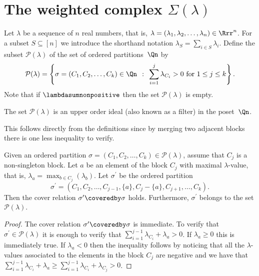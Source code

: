 \section{The weighted complex \texorpdfstring{$\Sigma(\lambda)$}{Sigma(lambda)}}
\label{section_the_weighted_complex}

Let $\lambda$ be a sequence of $n$ real numbers,
that is, $\lambda = (\lambda_{1}, \lambda_{2}, \ldots, \lambda_{n}) \in \Rrr^{n}$.
For a subset $S \subseteq [n]$ we introduce the shorthand notation
$\lambda_{S} = \sum_{i \in S} \lambda_{i}$.
Define the subset $\mathcal{P}(\lambda)$ of the set of ordered 
partitions~$\Qn$ by
$$
\mathcal{P}(\lambda)
=
\left\{ \sigma = (C_{1}, C_{2}, \ldots, C_{k}) \in \Qn \:\: : \:\:
\sum_{i=1}^{j} \lambda_{C_{i}} > 0 \text{ for } 1 \leq j \leq k \right\} .
$$
Note that if $\lambdasumnonpositive$
then the set $\mathcal{P}(\lambda)$ is empty.


\begin{lemma}
The set $\mathcal{P}(\lambda)$ is an upper order ideal (also
known as a filter)
in the poset~$\Qn$.
\end{lemma}
This follows directly from the definitions
since by merging two adjacent blocks
there is one less inequality to verify.

\begin{lemma}
Given an ordered partition
$\sigma = (C_{1}, C_{2}, \ldots, C_{k}) \in \mathcal{P}(\lambda)$,
assume that $C_{j}$ is a non-singleton block.
Let $a$ be an element of the block $C_{j}$
with maximal $\lambda$-value,
that is,
$\lambda_{a} = \max_{b \in C_{j}}(\lambda_{b})$.
Let $\sigma^{\prime}$ be the ordered partition
$$
\sigma^{\prime}
=
(C_{1}, C_{2}, \ldots, C_{j-1}, \{a\}, C_{j} - \{a\}, C_{j+1}, \ldots, C_{k}) .
$$
Then the cover relation $\sigma^{\prime} \coveredby \sigma$ holds.
Furthermore, $\sigma^{\prime}$ belongs to the set $\mathcal{P}(\lambda)$.
\label{lemma_split}
\end{lemma}
\begin{proof}
The cover relation $\sigma^{\prime} \coveredby \sigma$ is immediate.
To verify that
$\sigma^{\prime} \in \mathcal{P}(\lambda)$
it is enough to verify that
$\sum_{i=1}^{j-1} \lambda_{C_{i}} + \lambda_{a} > 0$.
If $\lambda_{a} \geq 0$ this is immediately true.
If $\lambda_{a} < 0$ then
the inequality follows by noticing that all the 
$\lambda$-values associated to
the elements in the block $C_{j}$
are negative and we have that
$\sum_{i=1}^{j-1} \lambda_{C_{i}} + \lambda_{a} \geq
\sum_{i=1}^{j-1} \lambda_{C_{i}} + \lambda_{C_{j}} > 0$.
\end{proof}


